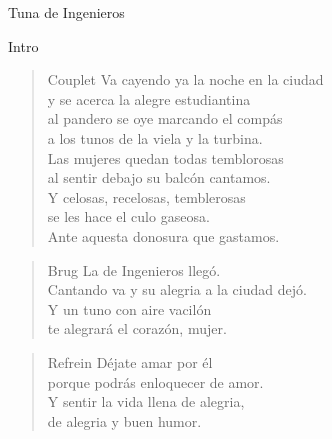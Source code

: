 \begin{song}{Tuna de Ingenieros}

\begin{instrumental}{Intro}
   
   
   
   
\end{instrumental}

\begin{verse}{Couplet}
Va cayendo ya la noche en la ciudad\\
y se acerca la alegre estudiantina\\
al pandero se oye marcando el compás\chord{}\\
a los tunos de la viela y la turbina.\\
Las mujeres quedan todas temblorosas\chord{}\\
al sentir debajo su balcón cantamos.\\
Y celosas, recelosas, temblerosas\\
se les hace el culo gaseosa.\\
Ante aquesta donosura que gastamos.
\end{verse}

\begin{verse}{Brug}
\hspace{4em}La de Ingenieros llegó.\\
Cantando va y su alegria a la ciudad dejó.\\
Y un tuno con aire vacilón\chord{}\\
te alegrará el corazón, mujer.
\end{verse}

\begin{verse}{Refrein}
Déjate amar por él\\
porque podrás enloquecer de amor.\\
Y sentir la vida llena de alegria,\\
de alegria y buen humor.
\end{verse}

\end{song}

